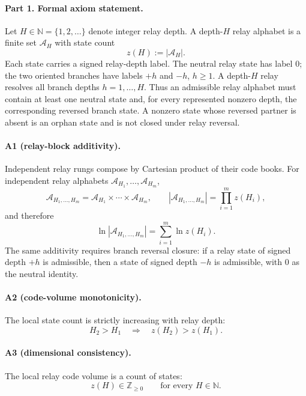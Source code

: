 \paragraph{Part 1. Formal axiom statement.}
Let \(H\in\mathbb N=\{1,2,\ldots\}\) denote integer relay depth. A depth-\(H\) relay alphabet is a finite set \(\mathcal A_H\) with state count
\begin{equation}
z(H):=|\mathcal A_H|.
\end{equation}
Each state carries a signed relay-depth label. The neutral relay state has label \(0\); the two oriented branches have labels \(+h\) and \(-h\), \(h\geq 1\). A depth-\(H\) relay resolves all branch depths \(h=1,\ldots,H\). Thus an admissible relay alphabet must contain at least one neutral state and, for every represented nonzero depth, the corresponding reversed branch state. A nonzero state whose reversed partner is absent is an orphan state and is not closed under relay reversal.

\paragraph{A1 (relay-block additivity).}
Independent relay rungs compose by Cartesian product of their code books. For independent relay alphabets \(\mathcal A_{H_1},\ldots,\mathcal A_{H_m}\),
\begin{equation}
\mathcal A_{H_1,\ldots,H_m}
=
\mathcal A_{H_1}\times\cdots\times \mathcal A_{H_m},
\qquad
|\mathcal A_{H_1,\ldots,H_m}|
=
\prod_{i=1}^m z(H_i),
\end{equation}
and therefore
\begin{equation}
\ln |\mathcal A_{H_1,\ldots,H_m}|
=
\sum_{i=1}^m \ln z(H_i).
\end{equation}
The same additivity requires branch reversal closure: if a relay state of signed depth \(+h\) is admissible, then a state of signed depth \(-h\) is admissible, with \(0\) as the neutral identity.

\paragraph{A2 (code-volume monotonicity).}
The local state count is strictly increasing with relay depth:
\begin{equation}
H_2>H_1 \quad\Longrightarrow\quad z(H_2)>z(H_1).
\end{equation}

\paragraph{A3 (dimensional consistency).}
The local relay code volume is a count of states:
\begin{equation}
z(H)\in \mathbb Z_{\geq 0}
\qquad\text{for every }H\in\mathbb N.
\end{equation}

